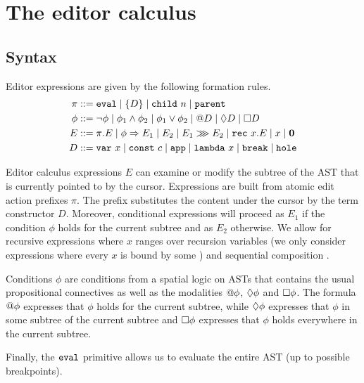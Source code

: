 \section{The editor calculus}

\subsection{Syntax}

Editor expressions are given by the following formation rules.
%
\begin{align}
    \pi &::= \texttt{eval}
  \mid \{ D \}
  \mid \texttt{child}~n
  \mid \texttt{parent} \label{aep-formation-rules} \\
   \phi &::= \neg\phi
  \mid \phi_1 \land \phi_2
  \mid \phi_1 \lor \phi_2
  \mid @D
  \mid \Diamond D
  \mid \Box D \label{eed-formation-rules} \\
    E &::= \pi.E
  \mid \phi \Rightarrow E_1 \mid E_2
  \mid E_1 \ggg E_2
  \mid \texttt{rec}~x.E
  \mid x
  \mid \mathbf{0} \label{edt-formation-rules} \\
    D &::= \texttt{var}~x
  \mid \texttt{const}~c
  \mid \texttt{app}
  \mid \texttt{lambda}~x
  \mid \texttt{break}
  \mid \texttt{hole} \label{aam-formation-rules}
\end{align}

Editor calculus expressions $E$ can examine or modify the subtree of the
AST that is currently pointed to by the cursor. Expressions are built
from atomic edit action prefixes $\pi$. The  prefix substitutes
the content under the cursor by the term constructor $D$. Moreover,
conditional expressions  will proceed as $E_1$
if the condition $\phi$ holds for the current subtree and as $E_2$
otherwise. We allow for recursive expressions  where $x$
ranges over recursion variables (we only consider expressions where
every $x$ is bound by some ) and sequential composition
.

Conditions $\phi$ are conditions from a spatial logic on ASTs that contains
the usual propositional connectives as well as the modalities
$@\phi$, $\Diamond \phi$ and $\Box \phi$. The formula
$@\phi$ expresses that $\phi$ holds for the current subtree, while
$\Diamond \phi$ expresses that $\phi$ in some subtree of the current
subtree and $\Box \phi$ expresses that $\phi$ holds
everywhere in the current subtree.

Finally, the $\texttt{eval}$ primitive allows us to evaluate the entire AST
(up to possible breakpoints).

